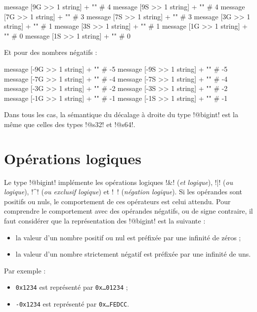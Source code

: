\begin{galgas4}
message [9G >> 1 string] + "\n" # 4
message [9S >> 1 string] + "\n" # 4
message [7G >> 1 string] + "\n" # 3
message [7S >> 1 string] + "\n" # 3
message [3G >> 1 string] + "\n" # 1
message [3S >> 1 string] + "\n" # 1
message [1G >> 1 string] + "\n" # 0
message [1S >> 1 string] + "\n" # 0
\end{galgas4}


Et pour des nombres négatifs :

\begin{galgas4}
message [-9G >> 1 string] + "\n" # -5
message [-9S >> 1 string] + "\n" # -5
message [-7G >> 1 string] + "\n" # -4
message [-7S >> 1 string] + "\n" # -4
message [-3G >> 1 string] + "\n" # -2
message [-3S >> 1 string] + "\n" # -2
message [-1G >> 1 string] + "\n" # -1
message [-1S >> 1 string] + "\n" # -1
\end{galgas4}

Dans tous les cas, la sémantique du décalage à droite du type \ggsq!@bigint! est la même que celles des types \ggsq!@s32! et \ggsq!@s64!.










\section{Opérations logiques}

Le type \ggsq!@bigint! implémente les opérations logiques \ggsq!&! (\emph{et logique}), \ggsq!|! (\emph{ou logique}), \ggsq!^! (\emph{ou exclusif logique}) et \ggsq!~! (\emph{négation logique}). Si les opérandes sont positifs ou nuls, le comportement de ces opérateurs est celui attendu. Pour comprendre le comportement avec des opérandes négatifs, ou de signe contraire, il faut considérer que la représentation des \ggsq!@bigint! est la suivante :
\begin{itemize}
  \item la valeur d'un nombre positif ou nul est préfixée par une infinité de zéros ;
  \item la valeur d'un nombre strictement négatif est préfixée par une infinité de uns.
\end{itemize}

Par exemple :
\begin{itemize}
  \item \texttt{0x1234} est représenté par \texttt{0x…01234} ;
  \item \texttt{-0x1234} est représenté par \texttt{0x…FEDCC}.
\end{itemize}


